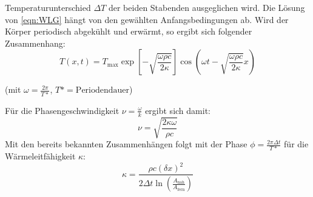 Temperaturunterschied $\Delta T$ der beiden Stabenden ausgeglichen wird.
Die Lösung von \eqref{eqn:WLG} hängt von den gewählten Anfangsbedingungen ab.
Wird der Körper periodisch abgekühlt und erwärmt, so ergibt sich folgender Zusammenhang:
\begin{equation}
  T(x, t)=T_\text{max}\exp{\!\!\left[-\sqrt{\frac{\omega \rho c}{2\kappa}}\right]} \cos{\left(\omega t - \sqrt{\frac{\omega \rho c}{2\kappa}} x \right)}
\end{equation}
\begin{center}
 \small {(mit $\omega=\frac{2\pi}{T*}$,  $T*=\text{Periodendauer}$})
\end{center}
Für die Phasengeschwindigkeit $\nu=\frac{\omega}{k}$ ergibt sich damit:
\begin{equation}
  \nu =\sqrt{\frac{2\kappa \omega}{\rho c}}
\end{equation}
Mit den bereits bekannten Zusammenhängen folgt mit der Phase $\phi=\frac{2 \pi \Delta t}{T*}$ für die
Wärmeleitfähigkeit $\kappa$:
\begin{equation}
  \kappa=\frac{\rho c \left(\delta x\right)^2}{2 \Delta t \ln{\left(\frac{A_\text{nah}}{A_\text{fern}}\right)}}
  \label{eqn:kap}
\end{equation}
